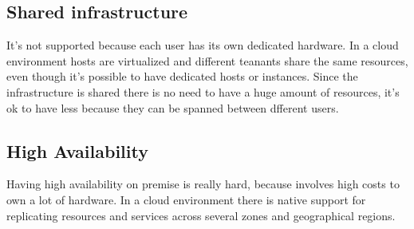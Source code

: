 \subsection{Shared infrastructure}
It's not supported because each user has its own dedicated hardware. \n
In a cloud environment hosts are virtualized and different teanants share the same resources, even though it's possible to have dedicated hosts or instances. Since the infrastructure is shared there is no need to have a huge amount of resources, it's ok to have less because they can be spanned between dfferent users.
\subsection{High Availability}
Having high availability on premise is really hard, because involves high costs to own a lot of hardware. \n
In a cloud environment there is native support for replicating resources and services across several zones and geographical regions.
